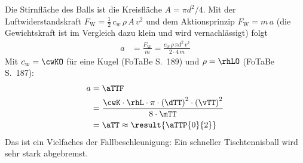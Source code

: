 Die Stirnfläche des Balls ist die Kreisfläche $A = \pi d^2/4$. Mit der Luftwiderstandskraft $F_\text{W} = \frac{1}{2}\,c_w\,\rho\,A\,v^2$ und dem Aktionsprinzip $F_\text{W} = m\,a$ (die Gewichtskraft ist im Vergleich dazu klein und wird vernachlässigt) folgt
\begin{align}
 a &= \frac{F_\text{W}}{m} = \frac{c_w\,\rho\,\pi d^2\,v^2}{2\cdot 4\,m}
\end{align}
Mit $c_w = \cwKO$ für eine Kugel (FoTaBe S.~189) und $\rho = \rhLO$ (FoTaBe S.~187):
\begin{align}
 a &= \aTTF \\
   &= \frac{\cwK\cdot\rhL\cdot\pi\cdot\left(\dTT\right)^2\cdot\left(\vTT\right)^2}{8\cdot\mTT} \\
   &= \aTT \approx \result{\aTTP{0}{2}}
\end{align}
Das ist ein Vielfaches der Fallbeschleunigung: Ein schneller Tischtennisball wird sehr stark abgebremst.
